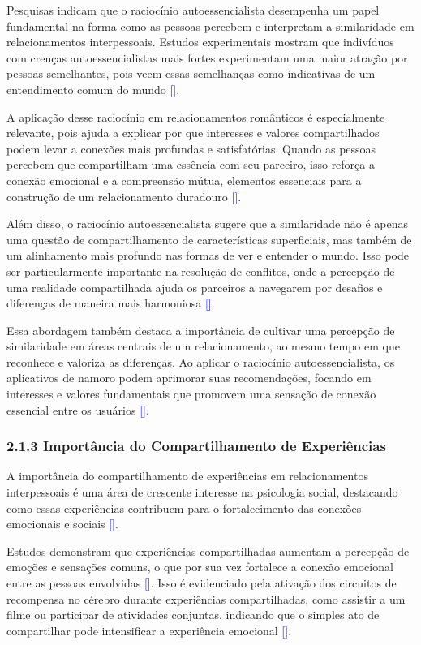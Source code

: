 Pesquisas indicam que o raciocínio autoessencialista desempenha um papel fundamental na forma como as pessoas percebem e interpretam a similaridade em relacionamentos interpessoais. Estudos experimentais mostram que indivíduos com crenças autoessencialistas mais fortes experimentam uma maior atração por pessoas semelhantes, pois veem essas semelhanças como indicativas de um entendimento comum do mundo \textcolor{blue}{[\cite{Montoya2013}]}.

A aplicação desse raciocínio em relacionamentos românticos é especialmente relevante, pois ajuda a explicar por que interesses e valores compartilhados podem levar a conexões mais profundas e satisfatórias. Quando as pessoas percebem que compartilham uma essência com seu parceiro, isso reforça a conexão emocional e a compreensão mútua, elementos essenciais para a construção de um relacionamento duradouro \textcolor{blue}{[\cite{Montoya2008}]}.

Além disso, o raciocínio autoessencialista sugere que a similaridade não é apenas uma questão de compartilhamento de características superficiais, mas também de um alinhamento mais profundo nas formas de ver e entender o mundo. Isso pode ser particularmente importante na resolução de conflitos, onde a percepção de uma realidade compartilhada ajuda os parceiros a navegarem por desafios e diferenças de maneira mais harmoniosa \textcolor{blue}{[\cite{Chu2023}]}.

Essa abordagem também destaca a importância de cultivar uma percepção de similaridade em áreas centrais de um relacionamento, ao mesmo tempo em que reconhece e valoriza as diferenças. Ao aplicar o raciocínio autoessencialista, os aplicativos de namoro podem aprimorar suas recomendações, focando em interesses e valores fundamentais que promovem uma sensação de conexão essencial entre os usuários \textcolor{blue}{[\cite{Montoya2013}]}.

\subsubsection{2.1.3 Importância do Compartilhamento de Experiências}
A importância do compartilhamento de experiências em relacionamentos interpessoais é uma área de crescente interesse na psicologia social, destacando como essas experiências contribuem para o fortalecimento das conexões emocionais e sociais \textcolor{blue}{[\cite{Berscheid1998}]}.

Estudos demonstram que experiências compartilhadas aumentam a percepção de emoções e sensações comuns, o que por sua vez fortalece a conexão emocional entre as pessoas envolvidas \textcolor{blue}{[\cite{Byrne1971}]}. Isso é evidenciado pela ativação dos circuitos de recompensa no cérebro durante experiências compartilhadas, como assistir a um filme ou participar de atividades conjuntas, indicando que o simples ato de compartilhar pode intensificar a experiência emocional \textcolor{blue}{[\cite{Montoya2008}]}.

